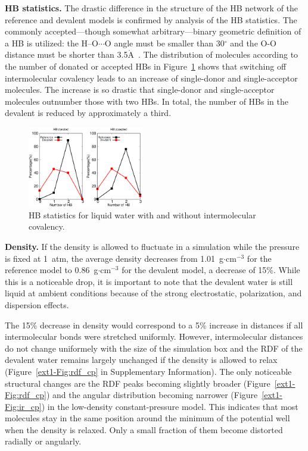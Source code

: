 \documentclass[10pt,amsmath,twocolumn,aps,prl,superscriptaddress,floatfix]{revtex4-1}
\newcommand{\Ang}{\ensuremath{\mathring{\text{A}}}}
\begin{document}
\textbf{HB statistics.} The drastic difference in the structure of the HB network of the reference and devalent models is confirmed by analysis of the HB statistics. 
The commonly accepted---though somewhat arbitrary---binary geometric definition of a HB is utilized: the H--O$\cdots$O angle must be smaller than 30$^{\circ}$ and the O-O distance must be shorter than 3.5\Ang~\cite{rey2002hydrogen,lawrence2003vibrational}. 
The distribution of molecules according to the number of donated or accepted HBs in Figure~\ref{fig:HBstat} shows that switching off intermolecular covalency leads to an increase of single-donor and single-acceptor molecules. 
The increase is so drastic that single-donor and single-acceptor molecules outnumber those with two HBs.
In total, the number of HBs in the devalent is reduced by approximately a third.

\begin{figure}
\includegraphics[width=0.45\textwidth]{new_hbstat}
\caption{HB statistics for liquid water with and without intermolecular covalency.}\label{fig:HBstat}
\end{figure}

\textbf{Density.} If the density is allowed to fluctuate in a simulation while the pressure is fixed at 1~atm, the average density decreases from 1.01~g$\cdot$cm$^{-3}$ for the reference model to 0.86~g$\cdot$cm$^{-3}$ for the devalent model, a decrease of 15\%. 
While this is a noticeable drop, it is important to note that the devalent water is still liquid at ambient conditions because of the strong electrostatic, polarization, and dispersion effects. 

The 15\% decrease in density would correspond to a 5\% increase in distances if all intermolecular bonds were stretched uniformly. 
However, intermolecular distances do not change uniformely with the size of the simulation box and the RDF of the devalent water remains largely unchanged if the density is allowed to relax (Figure~\ref{ext1-Fig:rdf_cp} in Supplementary Information). 
The only noticeable structural changes are the RDF peaks becoming slightly broader (Figure~\ref{ext1-Fig:rdf_cp}) and the angular distribution becoming narrower (Figure~\ref{ext1-Fig:ir_cp}) in the low-density constant-pressure model. 
This indicates that most molecules stay in the same position around the minimum of the potential well when the density is relaxed. 
Only a small fraction of them become distorted radially or angularly. 
\end{document}
